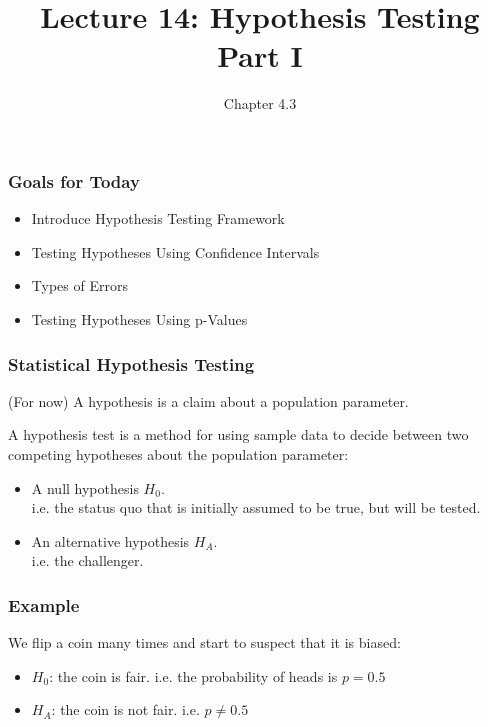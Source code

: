 \documentclass[handout]{beamer}
\title{Lecture 14: Hypothesis Testing Part I}
\author{Chapter 4.3}
\date{}
\newcommand{\blue}[1]{\textcolor{blue2}{#1}}
\begin{document}
\begin{frame}
\titlepage
\end{frame}


\begin{frame}[fragile]
\frametitle{Goals for Today}

\begin{itemize}
\item Introduce Hypothesis Testing Framework
\item Testing Hypotheses Using Confidence Intervals
\item Types of Errors
\item Testing Hypotheses Using p-Values
\end{itemize}

\end{frame}


\begin{frame}
\frametitle{Statistical Hypothesis Testing}

%
%
(For now) A \blue{hypothesis} is a claim about a population parameter.

\vskip 0.25cm

\pause A \blue{hypothesis test} is a method for using sample data to decide between two competing hypotheses about the population parameter:
\begin{itemize}
\pause \item A \blue{null hypothesis $H_0$}.\\
i.e. the \blue{status quo} that is initially assumed to be true, but will be tested. 
\pause \item An \blue{alternative hypothesis $H_A$}.\\
i.e. the \blue{challenger}.
\end{itemize}

\end{frame}


\begin{frame}
\frametitle{Example}
We flip a coin many times and start to suspect that it is biased:
\pause\begin{itemize}
\item $H_0$: the coin is fair.  i.e. the probability of heads is $p=0.5$
\item $H_A$: the coin is not fair.  i.e. $p \neq 0.5$
\end{itemize}
\end{frame}
\end{document}
